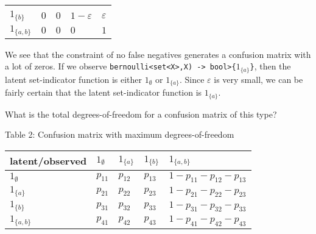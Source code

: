 \documentclass[
]{article}
\begin{document}
\begin{longtable}[]{@{}lllll@{}}
\begin{minipage}[t]{0.13\columnwidth}
\end{minipage}\tabularnewline
\begin{minipage}[t]{0.13\columnwidth}\raggedright
\(1_{\{b\}}\)\strut
\end{minipage} & \begin{minipage}[t]{0.16\columnwidth}\raggedright
\(0\)\strut
\end{minipage} & \begin{minipage}[t]{0.22\columnwidth}\raggedright
\(0\)\strut
\end{minipage} & \begin{minipage}[t]{0.22\columnwidth}\raggedright
\(1-\varepsilon\)\strut
\end{minipage} & \begin{minipage}[t]{0.13\columnwidth}\raggedright
\(\varepsilon\)\strut
\end{minipage}\tabularnewline
\begin{minipage}[t]{0.13\columnwidth}\raggedright
\(1_{\{a,b\}}\)\strut
\end{minipage} & \begin{minipage}[t]{0.16\columnwidth}\raggedright
\(0\)\strut
\end{minipage} & \begin{minipage}[t]{0.22\columnwidth}\raggedright
\(0\)\strut
\end{minipage} & \begin{minipage}[t]{0.22\columnwidth}\raggedright
\(0\)\strut
\end{minipage} & \begin{minipage}[t]{0.13\columnwidth}\raggedright
\(1\)\strut
\end{minipage}\tabularnewline
\bottomrule
\end{longtable}

We see that the constraint of no false negatives generates a confusion
matrix with a lot of zeros. If we observe
\texttt{bernoulli\textless{}set\textless{}X\textgreater{},X)\ -\textgreater{}\ bool\textgreater{}\{}\(1_{\{a\}}\)\texttt{\}},
then the latent set-indicator function is either \(1_{\emptyset}\) or
\(1_{\{a\}}\). Since \(\varepsilon\) is very small, we can be fairly
certain that the latent set-indicator function is \(1_{\{a\}}\).

What is the total degrees-of-freedom for a confusion matrix of this
type?

Table 2: Confusion matrix with maximum degrees-of-freedom

\begin{longtable}[]{@{}lllll@{}}
\toprule
latent/observed & \(1_\emptyset\) & \(1_{\{a\}}\) & \(1_{\{b\}}\) &
\(1_{\{a,b\}}\)\tabularnewline
\midrule
\endhead
\(1_\emptyset\) & \(p_{1 1}\) & \(p_{1 2}\) & \(p_{1 3}\) &
\(1-p_{1 1}-p_{1 2}-p_{1 3}\)\tabularnewline
\(1_{\{a\}}\) & \(p_{2 1}\) & \(p_{2 2}\) & \(p_{2 3}\) &
\(1-p_{2 1}-p_{2 2}-p_{2 3}\)\tabularnewline
\(1_{\{b\}}\) & \(p_{3 1}\) & \(p_{3 2}\) & \(p_{3 3}\) &
\(1-p_{3 1}-p_{3 2}-p_{3 3}\)\tabularnewline
\(1_{\{a,b\}}\) & \(p_{4 1}\) & \(p_{4 2}\) & \(p_{4 3}\) &
\(1-p_{4 1}-p_{4 2}-p_{4 3}\)\tabularnewline
\bottomrule
\end{longtable}
\end{document}
